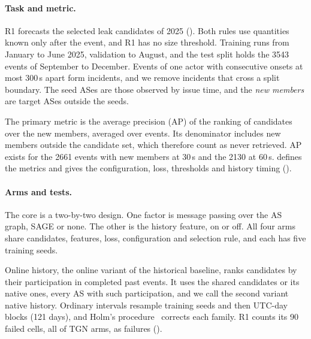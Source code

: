 \paragraph{Task and metric.}
R1 forecasts the selected leak candidates of 2025 ().
Both rules use quantities known only after the event, and R1 has no size threshold.
Training runs from January to June 2025, validation to August, and the test split holds the \num{3543} events of September to December.
Events of one actor with consecutive onsets at most 300\,s apart form incidents, and we remove incidents that cross a split boundary.
The seed ASes are those observed by issue time, and the \emph{new members} are target ASes outside the seeds.

The primary metric is the average precision (AP) of the ranking of candidates over the new members, averaged over events.
Its denominator includes new members outside the candidate set, which therefore count as never retrieved.
AP exists for the \num{2661} events with new members at 30\,s and the \num{2130} at 60\,s.
 defines the metrics and gives the configuration, loss, thresholds and history timing ().

\paragraph{Arms and tests.}
The core is a two-by-two design.
One factor is message passing over the AS graph, SAGE or none.
The other is the history feature, on or off.
All four arms share candidates, features, loss, configuration and selection rule, and each has five training seeds.

Online history, the online variant of the historical baseline, ranks candidates by their participation in completed past events.
It uses the shared candidates or its native ones, every AS with such participation, and we call the second variant native history.
Ordinary intervals resample training seeds and then UTC-day blocks (121 days), and Holm's procedure~\cite{holm1979} corrects each family.
R1 counts its 90 failed cells, all of TGN arms, as failures ().

